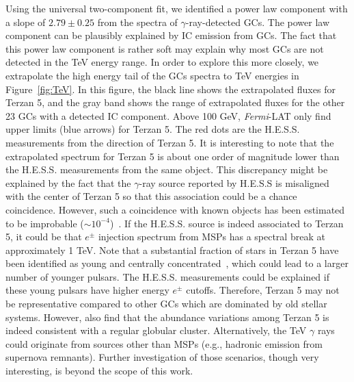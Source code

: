 \documentclass[doublespace,draft,nopageskip]{VTthesis} %
\begin{document}
Using the universal two-component fit, we identified a power law component with a slope of $2.79 \pm  0.25$ from the spectra of $\gamma$-ray-detected GCs. The power law component can be plausibly explained by IC emission from GCs. The fact that this power law component is rather soft may explain why most GCs are not detected in the TeV energy range. In order to explore this more closely, we extrapolate the high energy tail of the GCs spectra to TeV energies in Figure~\ref{fig:TeV}. In this figure, the black line shows the extrapolated fluxes for Terzan 5, and the gray band shows the range of extrapolated fluxes for the other 23 GCs with a detected IC component. Above 100 GeV, {\it Fermi}-LAT only find upper limits (blue arrows) for Terzan 5. The red dots are the H.E.S.S. measurements from the direction of Terzan 5. It is interesting to note that the extrapolated spectrum for Terzan 5 is about one order of magnitude lower than the H.E.S.S. measurements from the same object. This discrepancy might be explained by the fact that the $\gamma$-ray source reported by H.E.S.S is misaligned with the center of Terzan 5 so that this association could be a chance coincidence. However, such a coincidence with known objects has been estimated to be improbable ($\sim 10^{-4}$)~\citep{2011A&A...531L..18H}. If the H.E.S.S. source is indeed associated to Terzan 5, it could be that $e^\pm$ injection spectrum from MSPs has a spectral break at approximately 1 TeV. Note that a substantial fraction of stars in Terzan 5 have been identified as young and centrally concentrated~\citep{2016ApJ...828...75F,2020BAAA..61R...90G}, which could lead to a larger number of younger pulsars. The H.E.S.S. measurements could be explained if these young pulsars have higher energy $e^\pm$ cutoffs. Therefore, Terzan 5 may not be representative compared to other GCs which are dominated by old stellar systems. However, \citet{2019AJ....158...14N} also find that the abundance variations among Terzan 5 is indeed consistent with a regular globular cluster. Alternatively, the TeV $\gamma$ rays could originate from sources other than MSPs (e.g., hadronic emission from supernova remnants). Further investigation of those scenarios, though very interesting, is beyond the scope of this work. 
\end{document}
